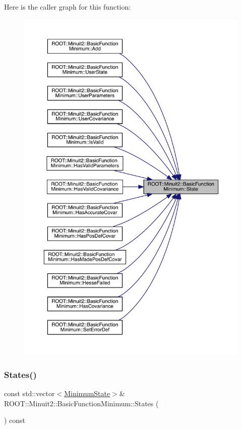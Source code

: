 Here is the caller graph for this function\+:\nopagebreak
\begin{figure}[H]
\begin{center}
\leavevmode
\includegraphics[width=350pt]{de/d25/classROOT_1_1Minuit2_1_1BasicFunctionMinimum_a57c7f1a6d3551fd329698e0fc9424fec_icgraph}
\end{center}
\end{figure}
\mbox{\label{classROOT_1_1Minuit2_1_1BasicFunctionMinimum_a89080776340dc1cad0d73357a6c4b401}} 
\subsubsection{\texorpdfstring{States()}{States()}\hspace{0.1cm}{\footnotesize\ttfamily [1/2]}}
{\footnotesize\ttfamily const std\+::vector$<$\mbox{\hyperlink{classROOT_1_1Minuit2_1_1MinimumState}{Minimum\+State}}$>$\& R\+O\+O\+T\+::\+Minuit2\+::\+Basic\+Function\+Minimum\+::\+States (\begin{DoxyParamCaption}{ }\end{DoxyParamCaption}) const\hspace{0.3cm}{\ttfamily [inline]}}

